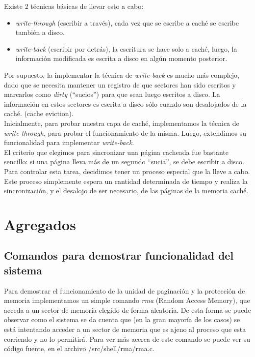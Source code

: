 \documentclass[a4paper,10pt]{article}
\begin{document}
        Existe 2 técnicas básicas de llevar esto a cabo:

        \begin{itemize}
        \item \textit{write-through} (escribir a través), cada vez que se escribe a caché se escribe también a disco.
        \item \textit{write-back} (escribir por detrás), la escritura se hace solo a caché, luego, la información modificada es escrita a disco en algún momento posterior.
        \end{itemize}

        Por supuesto, la implementar la técnica de \textit{write-back} es mucho más complejo, dado que se necesita mantener un registro de que sectores han sido escritos y 
        marcarlos como \textit{dirty} (``sucios'') para que sean luego escritos a disco. La información en estos sectores es escrita a disco sólo cuando son desalojados
        de la caché. (cache eviction). \\

        Inicialmente, para probar nuestra capa de caché, implementamos la técnica de \textit{write-through}, para probar el funcionamiento de la misma. 
        Luego, extendimos su funcionalidad para implementar \textit{write-back}. \\

        El criterio que elegimos para sincronizar una página cacheada fue bastante sencillo: si una página lleva más de un segundo ``sucia'', se debe escribir a disco.
        Para controlar esta tarea, decidimos tener un proceso especial que la lleve a cabo. Este proceso simplemente espera un cantidad determinada de tiempo y realiza 
        la sincronización, y el desalojo de ser necesario, de las páginas de la memoria caché.


\newpage
\section{Agregados}

        \subsection{Comandos para demostrar funcionalidad del sistema}
             
        Para demostrar el funcionamiento de la unidad de paginación y la protección de memoria implementamos un simple comando \textit{rma} (Random Access Memory), 
        que acceda a un sector de memoria elegido de forma aleatoria. De esta forma se puede observar como el sistema se da cuenta que (en la gran mayoría de 
        los casos) se está intentando acceder a un sector de memoria que es ajeno al proceso que esta corriendo y no lo permitirá. Para ver más acerca de este 
        comando se puede ver su código fuente, en el archivo /src/shell/rma/rma.c.\\
\end{document}
